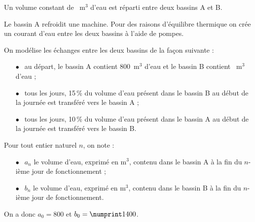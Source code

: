 Un volume constant de ~m$^3$ d'eau est réparti entre deux bassins A et B.
 
Le bassin A refroidit une machine. Pour des raisons d'équilibre thermique on crée un courant d'eau entre les deux bassins à l'aide de pompes.
 
On modélise les échanges entre les deux bassins de la façon suivante :
 
\setlength\parindent{8mm}
\begin{itemize}
\item[$\bullet~~$] au départ, le bassin A contient 800~m$^3$ d'eau et le bassin B contient ~m$^3$ d'eau ; 
\item[$\bullet~~$] tous les jours, 15\,\% du volume d'eau présent dans le bassin B au début de la journée est transféré vers le bassin A ; 
\item[$\bullet~~$] tous les jours, 10\,\% du volume d'eau présent dans le bassin A au début de la journée est transféré vers le bassin B.
\end{itemize}
\setlength\parindent{0mm}
 
Pour tout entier naturel $n$, on note : 

\setlength\parindent{8mm}
\begin{itemize}
\item[$\bullet~~$] $a_{n}$ le volume d'eau, exprimé en m$^3$, contenu dans le bassin A à la fin du $n$-ième jour de fonctionnement ; 
\item[$\bullet~~$] $b_{n}$ le volume d'eau, exprimé en m$^3$, contenu dans le bassin B à la fin du $n$-ième jour de fonctionnement.
\end{itemize}
\setlength\parindent{0mm}

\medskip
 
On a donc $a_{0} = 800$ et $b_{0} = \np{1400}$.

\medskip
 
